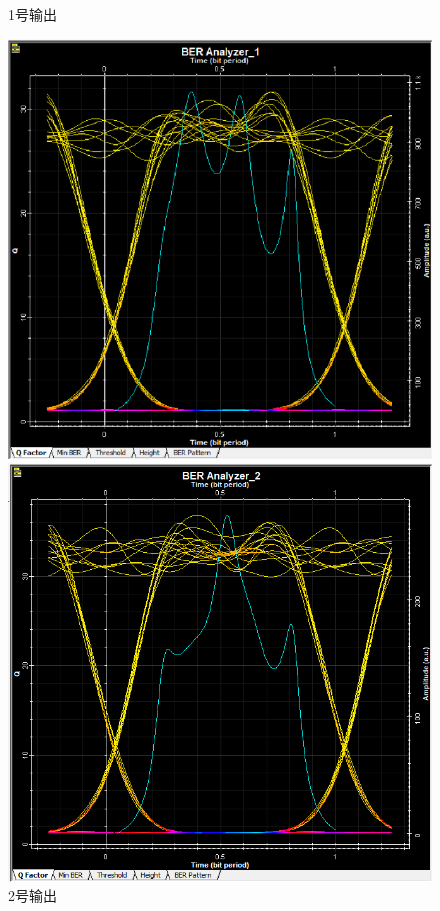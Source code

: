 \documentclass[12pt, a4paper, oneside]{article}
\begin{document}
\begin{spacing}{2.0}
\begin{figure}[H]
\begin{minipage}[t]{0.5\linewidth}
        \caption{1号输出}
        \label{fig:side:a}
      \end{minipage}%
      \begin{minipage}[t]{0.5\linewidth}
        \centering
        \includegraphics[scale=0.5]{sweep2Q2.png}
        \caption{2号输出}
        \label{fig:side:b}
      \end{minipage}
	  \begin{minipage}[t]{0.5\linewidth}
        \centering
        \includegraphics[scale=0.5]{sweep2Q3.png}

\end{minipage}
\end{figure}
\end{spacing}
\end{document}
